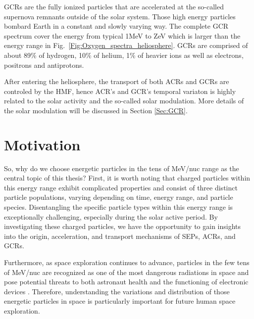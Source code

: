 \acp{GCR} are the fully ionized particles that are accelerated at the so-called supernova remnants \citep{Blasi2013AARv2013} outside of the solar system. Those high energy particles bombard Earth in a constant and slowly varying way. The complete GCR spectrum cover the energy from typical 1MeV \citep{Potgieter2013LRSP} to ZeV which is larger than the energy range in Fig.~\ref{Fig:Oxygen_spectra_heliosphere}. \acp{GCR} are comprised of about 89\% of hydrogen, 10\% of helium, 1\% of heavier ions as well as electrons, positrons and antiprotons. 

After entering the heliosphere, the transport of both \acp{ACR} and \acp{GCR} are controled by the \ac{HMF}, hence \ac{ACR}'s and \ac{GCR}'s temporal variaton is highly related to the solar activity and the so-called solar modulation. More details of the solar modulation will be discussed in Section \ref{Sec:GCR}.









\section{Motivation}

So, why do we choose energetic particles in the tens of MeV/nuc range as the central topic of this thesis? First, it is worth noting that charged particles within this energy range exhibit complicated properties and consist of three distinct particle populations, varying depending on time, energy range, and particle species. Disentangling the specific particle types within this energy range is exceptionally challenging, especially during the solar active period.
By investigating these charged particles, we have the opportunity to gain insights into the origin, acceleration, and transport mechanisms of \acp{SEP}, \acp{ACR}, and \acp{GCR}.

Furthermore, as space exploration continues to advance, particles in the few tens of MeV/nuc are recognized as one of the most dangerous radiations in space and pose potential threats to both astronaut health and the functioning of electronic devices \citep{Reames2021LNP,  mckenna2015recommendations, armstrong2014strategies}. Therefore, understanding the variations and distribution of those energetic particles in space is particularly important for future human space exploration.


